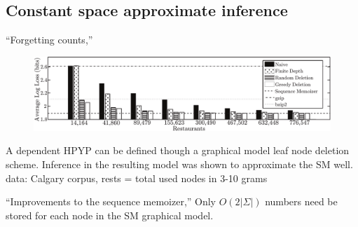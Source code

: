 \documentclass[16pt]{beamer}
\begin{document}
\subsection{Constant space approximate inference}
\begin{frame}[t]{}
\begin{block}{``Forgetting counts,'' \citet{Bartlett2010}}
\begin{figure}[htbp]
\begin{center}
\includegraphics[width=\textwidth]{results_calgary_corpus.pdf}
\end{center}
\end{figure}
A dependent HPYP can be defined though a graphical model leaf node deletion scheme.  Inference in the resulting model was shown to approximate the SM well.  \tiny{data: Calgary corpus, rests = total used nodes in 3-10 grams}
\end{block}
\begin{block}{``Improvements to the sequence memoizer,'' \cite{Gasthaus2011}}
Only $O(2|\Sigma|)$ numbers need be stored for each node in the SM graphical model.
\end{block}

\end{frame}
\end{document}
